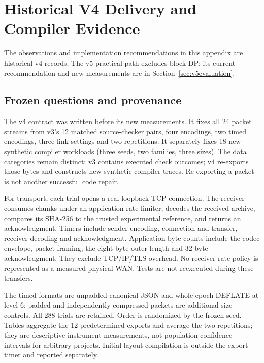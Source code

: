 \section{Historical V4 Delivery and Compiler Evidence}\label{app:v4evidence}\label{sec:evaluation}
The observations and implementation recommendations in this appendix are historical v4 records. The v5 practical path excludes block DP; its current recommendation and new measurements are in Section~\ref{sec:v5evaluation}.

\subsection{Frozen questions and provenance}
The v4 contract was written before its new measurements. It fixes all 24 packet streams from v3's 12 matched source-checker pairs, four encodings, two timed encodings, three link settings and two repetitions. It separately fixes 18 new synthetic compiler workloads (three seeds, two families, three sizes). The data categories remain distinct: v3 contains executed check outcomes; v4 re-exports those bytes and constructs new synthetic compiler traces. Re-exporting a packet is not another successful code repair.

For transport, each trial opens a real loopback TCP connection. The receiver consumes chunks under an application-rate limiter, decodes the received archive, compares its SHA-256 to the trusted experimental reference, and returns an acknowledgment. Timers include sender encoding, connection and transfer, receiver decoding and acknowledgment. Application byte counts include the codec envelope, packet framing, the eight-byte outer length and 32-byte acknowledgment. They exclude TCP/IP/TLS overhead. No receiver-rate policy is represented as a measured physical WAN. Tests are not reexecuted during these transfers.

The timed formats are unpadded canonical JSON and whole-epoch DEFLATE at level 6; padded and independently compressed packets are additional size controls. All 288 trials are retained. Order is randomized by the frozen seed. Tables aggregate the 12 predetermined exports and average the two repetitions; they are descriptive instrument measurements, not population confidence intervals for arbitrary projects. Initial layout compilation is outside the export timer and reported separately.

